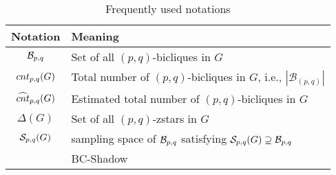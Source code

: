 \begin{table}[htb]
	\small
	\caption{Frequently used notations}
	\label{table:notations}

	\begin{tabular}{c|l} \hline
		Notation & Meaning \\ \hline
	$\mathcal{B}_{p,q}$ & Set of all $(p,q)$-bicliques in $G$ \\
	${cnt_{p,q}(G) }$ & Total number of $(p,q)$-bicliques in $G$, i.e., $|\mathcal{B}_{(p,q)}|$ \\
	${\widehat{cnt}_{p,q}(G) }$ & Estimated total number of $(p,q)$-bicliques in $G$ \\
	$\Delta(G)$ & Set of all $(p,q)$-zstars in $G$ \\
	$\mathcal{S}_{p,q}(G)$ & sampling space of $\mathcal{B}_{p,q}$ satisfying $\mathcal{S}_{p,q}(G) \supseteq \mathcal{B}_{p,q}$ \\
	\shadow & BC-Shadow \\

	\end{tabular}
\end{table}


